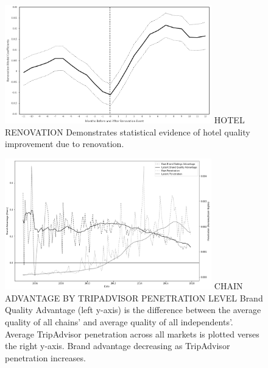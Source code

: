 \documentclass{informs_mod} %
\begin{document}
\begin{figure}[htp]
\FIGURE
{\includegraphics[width=0.8\textwidth,height=\textheight,keepaspectratio]{./Figures/Reno_Reg.png}}
{HOTEL RENOVATION\label{fig:reno_reg}}
{Demonstrates statistical evidence of hotel quality improvement due to renovation.}
\end{figure}
\clearpage

\begin{figure}[htp]
\FIGURE
{\includegraphics[width=0.8\textwidth,height=\textheight,keepaspectratio]{./Figures/OTA_Brand_v_Chain_v_PenetrationV2.png}}
{CHAIN ADVANTAGE BY TRIPADVISOR PENETRATION LEVEL\label{fig:modelfree}}
{Brand Quality Advantage (left y-axis) is the difference between the average quality of all chains' and average quality of all independents'. Average TripAdvisor penetration across all markets is plotted verses the right y-axis. Brand advantage decreasing as TripAdvisor penetration increases.}
\end{figure}
\clearpage
\end{document}
